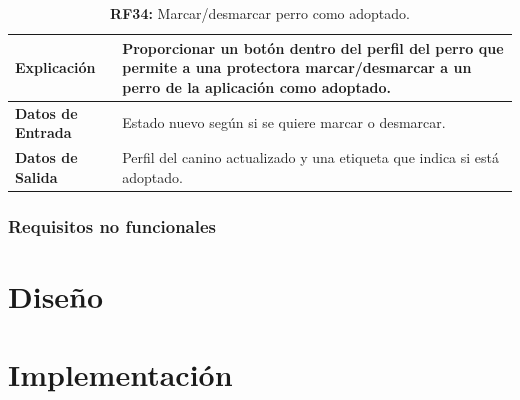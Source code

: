 \documentclass[a4paper, 12pt]{article}
\begin{document}
\begin{table}[H]
\captionsetup{justification=raggedright,singlelinecheck=false}
\caption{\textbf{RF34:} Marcar/desmarcar perro como adoptado.}
\label{tab:RF34}
	\begin{tabular}{|m{5cm}|m{10cm}|}
	\hline
	\textbf{Explicación} & Proporcionar un botón dentro del perfil del perro que permite a una protectora marcar/desmarcar a un perro de la aplicación como adoptado. \\ 
	\hline
	\textbf{Datos de Entrada} & Estado nuevo según si se quiere marcar o desmarcar. \\ 
	\hline
	\textbf{Datos de Salida} & Perfil del canino actualizado y una etiqueta que indica si está adoptado. \\ 
	\hline
\end{tabular}
\end{table}




\subsubsection{Requisitos no funcionales}


\newpage
\section{Diseño}

\newpage
\section{Implementación}

\printindex
\end{document}
